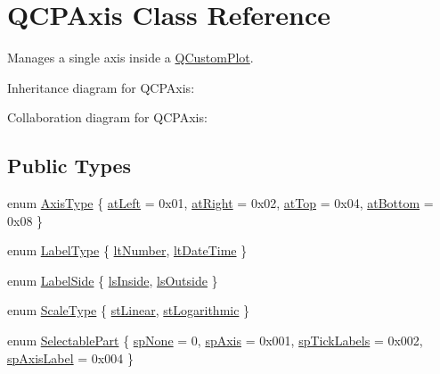 \hypertarget{class_q_c_p_axis}{}\section{Q\+C\+P\+Axis Class Reference}
\label{class_q_c_p_axis}


Manages a single axis inside a \hyperlink{class_q_custom_plot}{Q\+Custom\+Plot}.  




Inheritance diagram for Q\+C\+P\+Axis\+:


Collaboration diagram for Q\+C\+P\+Axis\+:
\subsection*{Public Types}
\begin{DoxyCompactItemize}
\item 
enum \hyperlink{class_q_c_p_axis_ae2bcc1728b382f10f064612b368bc18a}{Axis\+Type} \{ \hyperlink{class_q_c_p_axis_ae2bcc1728b382f10f064612b368bc18aaf84aa6cac6fb6099f54a2cbf7546b730}{at\+Left} = 0x01, 
\hyperlink{class_q_c_p_axis_ae2bcc1728b382f10f064612b368bc18aadf5509f7d29199ef2f263b1dd224b345}{at\+Right} = 0x02, 
\hyperlink{class_q_c_p_axis_ae2bcc1728b382f10f064612b368bc18aac0ece2b680d3f545e701f75af1655977}{at\+Top} = 0x04, 
\hyperlink{class_q_c_p_axis_ae2bcc1728b382f10f064612b368bc18aa220d68888516b6c3b493d144f1ba438f}{at\+Bottom} = 0x08
 \}
\item 
enum \hyperlink{class_q_c_p_axis_a4a7da0166f755f5abac23b765d184cad}{Label\+Type} \{ \hyperlink{class_q_c_p_axis_a4a7da0166f755f5abac23b765d184cada7f1eacf3b73adaefd334bea04e094b7e}{lt\+Number}, 
\hyperlink{class_q_c_p_axis_a4a7da0166f755f5abac23b765d184cadafc70594a9d877124dd11ccc187d4ac52}{lt\+Date\+Time}
 \}
\item 
enum \hyperlink{class_q_c_p_axis_a24b13374b9b8f75f47eed2ea78c37db9}{Label\+Side} \{ \hyperlink{class_q_c_p_axis_a24b13374b9b8f75f47eed2ea78c37db9aae7b027ac2839cf4ad611df30236fc3f}{ls\+Inside}, 
\hyperlink{class_q_c_p_axis_a24b13374b9b8f75f47eed2ea78c37db9a2eadb509fc0c9a8b35b85c86ec9f3c7a}{ls\+Outside}
 \}
\item 
enum \hyperlink{class_q_c_p_axis_a36d8e8658dbaa179bf2aeb973db2d6f0}{Scale\+Type} \{ \hyperlink{class_q_c_p_axis_a36d8e8658dbaa179bf2aeb973db2d6f0aff6e30a11a828bc850caffab0ff994f6}{st\+Linear}, 
\hyperlink{class_q_c_p_axis_a36d8e8658dbaa179bf2aeb973db2d6f0abf5b785ad976618816dc6f79b73216d4}{st\+Logarithmic}
 \}
\item 
enum \hyperlink{class_q_c_p_axis_abee4c7a54c468b1385dfce2c898b115f}{Selectable\+Part} \{ \hyperlink{class_q_c_p_axis_abee4c7a54c468b1385dfce2c898b115fae0df8123a5528d5ccf87cb7794f971ea}{sp\+None} = 0, 
\hyperlink{class_q_c_p_axis_abee4c7a54c468b1385dfce2c898b115fa8949d2c1a31eccae9be7ed32e7a1ae38}{sp\+Axis} = 0x001, 
\hyperlink{class_q_c_p_axis_abee4c7a54c468b1385dfce2c898b115fa584e0a3dc4d064880647619f4bd4e771}{sp\+Tick\+Labels} = 0x002, 
\hyperlink{class_q_c_p_axis_abee4c7a54c468b1385dfce2c898b115fa851e0600e0d08b4f5fee9361e3fedabd}{sp\+Axis\+Label} = 0x004
 \}
\end{DoxyCompactItemize}
